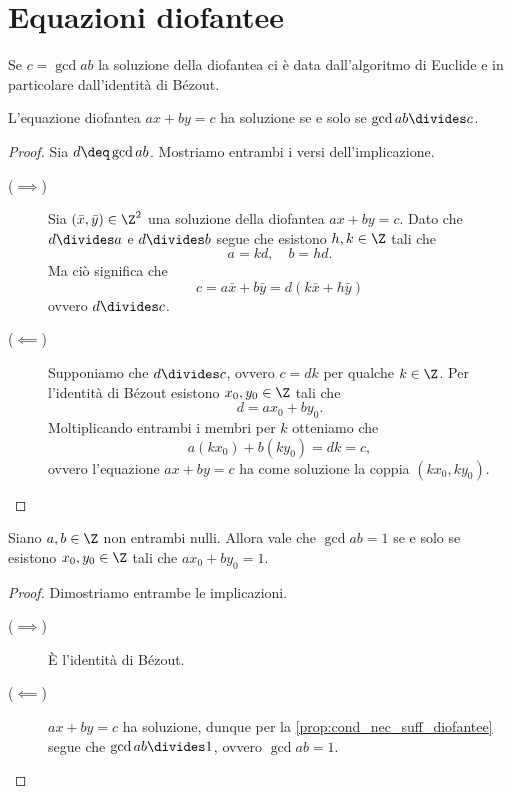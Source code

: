 \section{Equazioni diofantee}


\begin{remark}
    Se $c = \gcd{a}{b}$ la soluzione della diofantea ci è data dall'algoritmo di Euclide e in particolare dall'identità di Bézout.
\end{remark}

\begin{proposition}
    \label{prop:cond_nec_suff_diofantee}
    L'equazione diofantea $ax + by = c$ ha soluzione se e solo se $\gcd{a}{b} \divides c$.
\end{proposition}
\begin{proof}
    Sia $d \deq \gcd{a}{b}$. Mostriamo entrambi i versi dell'implicazione.
    \begin{description}
        \item[($\implies$)] Sia $(\bar x, \bar y) \in \Z^2$ una soluzione della diofantea $ax + by = c$. Dato che $d \divides a$ e $d \divides b$ segue che esistono $h, k \in \Z$ tali che \[
            a = kd, \quad b = hd.    
        \] Ma ciò significa che \[
            c = a\bar x + b\bar y = d(k\bar x + h\bar y)    
        \] ovvero $d \divides c$.
        \item[($\impliedby$)] Supponiamo che $d \divides c$, ovvero $c = dk$ per qualche $k \in \Z$. Per l'identità di Bézout esistono $x_0, y_0 \in \Z$ tali che \[
            d = ax_0 + by_0.    
        \] Moltiplicando entrambi i membri per $k$ otteniamo che \[
            a(kx_0) + b(ky_0) = dk = c,    
        \] ovvero l'equazione $ax + by = c$ ha come soluzione la coppia $(kx_0, ky_0)$. \qedhere
    \end{description}
\end{proof}

\begin{corollary} \label{cor:mcd=1_sse_comb_lin_1}
    Siano $a, b \in \Z$ non entrambi nulli. Allora vale che $\gcd{a}{b} = 1$ se e solo se esistono $x_0, y_0 \in \Z$ tali che $ax_0 + by_0 = 1$.
\end{corollary}
\begin{proof}
    Dimostriamo entrambe le implicazioni.
    \begin{description}
        \item[($\implies$)] È l'identità di Bézout.
        \item[($\impliedby$)] $ax + by = c$ ha soluzione, dunque per la \autoref{prop:cond_nec_suff_diofantee} segue che $\gcd{a}{b} \divides 1$, ovvero $\gcd{a}{b} = 1$.
    \end{description}
\end{proof}

